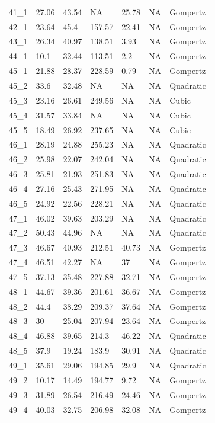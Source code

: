 \documentclass[titlepage]{article}
\begin{document}
\begin{longtable}{lllllll}
41\_1 & 27.06 & 43.54 & NA & 25.78 & NA & Gompertz \\
42\_1 & 23.64 & 45.4 & 157.57 & 22.41 & NA & Gompertz \\
43\_1 & 26.34 & 40.97 & 138.51 & 3.93 & NA & Gompertz \\
44\_1 & 10.1 & 32.44 & 113.51 & 2.2 & NA & Gompertz \\
45\_1 & 21.88 & 28.37 & 228.59 & 0.79 & NA & Gompertz \\
45\_2 & 33.6 & 32.48 & NA & NA & NA & Quadratic \\
45\_3 & 23.16 & 26.61 & 249.56 & NA & NA & Cubic \\
45\_4 & 31.57 & 33.84 & NA & NA & NA & Cubic \\
45\_5 & 18.49 & 26.92 & 237.65 & NA & NA & Cubic \\
46\_1 & 28.19 & 24.88 & 255.23 & NA & NA & Quadratic \\
46\_2 & 25.98 & 22.07 & 242.04 & NA & NA & Quadratic \\
46\_3 & 25.81 & 21.93 & 251.83 & NA & NA & Quadratic \\
46\_4 & 27.16 & 25.43 & 271.95 & NA & NA & Quadratic \\
46\_5 & 24.92 & 22.56 & 228.21 & NA & NA & Quadratic \\
47\_1 & 46.02 & 39.63 & 203.29 & NA & NA & Quadratic \\
47\_2 & 50.43 & 44.96 & NA & NA & NA & Quadratic \\
47\_3 & 46.67 & 40.93 & 212.51 & 40.73 & NA & Gompertz \\
47\_4 & 46.51 & 42.27 & NA & 37 & NA & Gompertz \\
47\_5 & 37.13 & 35.48 & 227.88 & 32.71 & NA & Gompertz \\
48\_1 & 44.67 & 39.36 & 201.61 & 36.67 & NA & Gompertz \\
48\_2 & 44.4 & 38.29 & 209.37 & 37.64 & NA & Gompertz \\
48\_3 & 30 & 25.04 & 207.94 & 23.64 & NA & Gompertz \\
48\_4 & 46.88 & 39.65 & 214.3 & 46.22 & NA & Quadratic \\
48\_5 & 37.9 & 19.24 & 183.9 & 30.91 & NA & Quadratic \\
49\_1 & 35.61 & 29.06 & 194.85 & 29.9 & NA & Quadratic \\
49\_2 & 10.17 & 14.49 & 194.77 & 9.72 & NA & Gompertz \\
49\_3 & 31.89 & 26.54 & 216.49 & 24.46 & NA & Gompertz \\
49\_4 & 40.03 & 32.75 & 206.98 & 32.08 & NA & Gompertz \\

\end{longtable}
\end{document}
